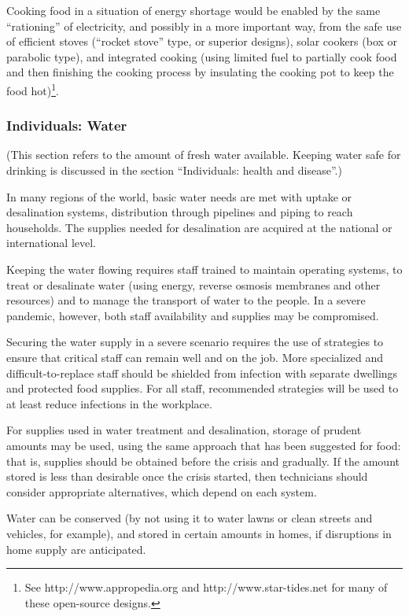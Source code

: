 \documentclass[12pt, a4]{scrartcl}
\begin{document}
Cooking food in a situation of energy shortage would be enabled by the same “rationing” of electricity, and possibly in a more important way, from the safe use of efficient stoves (“rocket stove” type, or superior designs), solar cookers (box or parabolic type), and integrated cooking (using limited fuel to partially cook food and then finishing the cooking process by insulating the cooking pot to keep the food hot)\footnote{See http://www.appropedia.org and http://www.star-tides.net for many of these open-source designs.}.

\subsubsection{Individuals: Water}
(This section refers to the amount of fresh water available. Keeping water safe for drinking is discussed in the section “Individuals: health and disease”.)

In many regions of the world, basic water needs are met with uptake or desalination systems, distribution through pipelines and piping to reach households. The supplies needed for desalination are acquired at the national or international level.

Keeping the water flowing requires staff trained to maintain operating systems, to treat or desalinate water (using energy, reverse osmosis membranes and other resources) and to manage the transport of water to the people. In a severe pandemic, however, both staff availability and supplies may be compromised.

Securing the water supply in a severe scenario requires the use of strategies to ensure that critical staff can remain well and on the job. More specialized and difficult-to-replace staff should be shielded from infection with separate dwellings and protected food supplies. For all staff, recommended strategies will be used to at least reduce infections in the workplace.

For supplies used in water treatment and desalination, storage of prudent amounts may be used, using the same approach that has been suggested for food: that is, supplies should be obtained before the crisis and gradually. If the amount stored is less than desirable once the crisis started, then technicians should consider appropriate alternatives, which depend on each system.

Water can be conserved (by not using it to water lawns or clean streets and vehicles, for example), and stored in certain amounts in homes, if disruptions in home supply are anticipated.
\end{document}
